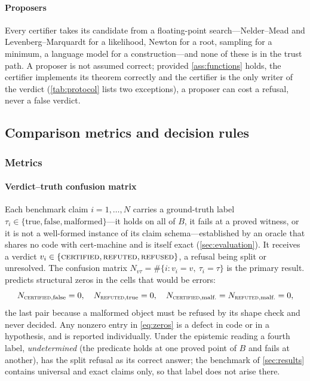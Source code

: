 \documentclass[preprint,11pt,a4paper]{elsarticle}
\theoremstyle{definition}
\newcommand{\verdict}[1]{\textup{\textsc{#1}}}
\newcommand{\CERT}{\verdict{certified}}
\newcommand{\REFT}{\verdict{refuted}}
\newcommand{\REFS}{\verdict{refused}}
\begin{document}
\paragraph{Proposers}
Every certifier takes its candidate from a floating-point search---Nelder--Mead and Levenberg--Marquardt for a likelihood, Newton for a root, sampling for a minimum, a language model for a construction---and none of these is in the trust path. A proposer is not assumed correct; provided \cref{ass:functions} holds, the certifier implements its theorem correctly and the certifier is the only writer of the verdict (\cref{tab:protocol} lists two exceptions), a proposer can cost a refusal, never a false verdict.

\subsection{Comparison metrics and decision rules}\label{sec:metrics}

\subsubsection{Metrics}\label{sec:metricsdef}

\paragraph{Verdict--truth confusion matrix}
Each benchmark claim $i=1,\dots,N$ carries a ground-truth label $\tau_i\in\{\text{true},\text{false},\text{malformed}\}$---it holds on all of $B$, it fails at a proved witness, or it is not a well-formed instance of its claim schema---established by an oracle that shares no code with cert-machine and is itself exact (\cref{sec:evaluation}). It receives a verdict $v_i\in\{\CERT,\REFT,\REFS\}$, a refusal being split or unresolved. The confusion matrix $N_{v\tau}=\#\{i: v_i=v,\ \tau_i=\tau\}$ is the primary result.  predicts structural zeros in the cells that would be errors:
\begin{equation}\label{eq:zeros}
N_{\CERT,\text{false}}=0,\quad N_{\REFT,\text{true}}=0,\quad N_{\CERT,\text{malf.}}=N_{\REFT,\text{malf.}}=0,
\end{equation}
the last pair because a malformed object must be refused by its shape check and never decided. Any nonzero entry in \cref{eq:zeros} is a defect in code or in a hypothesis, and is reported individually. Under the epistemic reading a fourth label, \emph{undetermined} (the predicate holds at one proved point of $B$ and fails at another), has the split refusal as its correct answer; the benchmark of \cref{sec:results} contains universal and exact claims only, so that label does not arise there.
\end{document}
